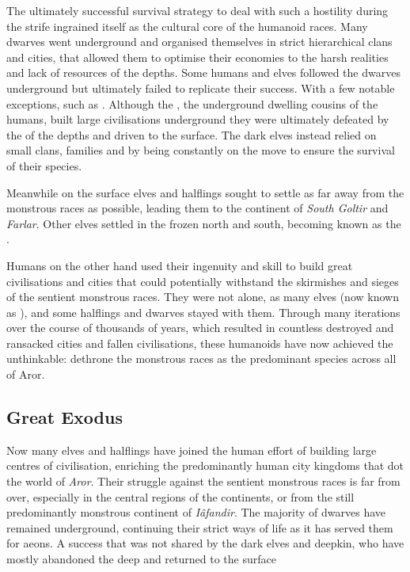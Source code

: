 The ultimately successful survival strategy to deal with such a hostility
during the strife ingrained itself as the cultural core of the humanoid
races. Many dwarves went underground and organised themselves in strict
hierarchical clans and cities, that allowed them to optimise their economies to
the harsh realities and lack of resources of the depths. Some humans and elves
followed the dwarves underground but ultimately failed to replicate their
success. With a few notable exceptions, such as .
Although the , the underground dwelling cousins of the
humans, built large civilisations underground they were ultimately defeated by
the  of the depths and driven to the surface. The dark elves
instead relied on small clans, families and by being constantly on the move to
ensure the survival of their species.

Meanwhile on the surface elves and halflings sought to settle as far away from
the monstrous races as possible, leading them to the continent of \emph{South
Goltir} and \emph{Farlar}. Other elves settled in the frozen north and south,
becoming known as the .

Humans on the other hand used their ingenuity and skill to build great
civilisations and cities that could potentially withstand the skirmishes and
sieges of the sentient monstrous races. They were not alone, as many elves
(now known as ), and some halflings and dwarves stayed
with them. Through many iterations over the course of thousands of years,
which resulted in countless destroyed and ransacked cities and fallen
civilisations, these humanoids have now achieved the unthinkable: dethrone the
monstrous races as the predominant species across all of Aror.

\subsection{Great Exodus}
\label{sec:Great Exodus}

Now many elves and halflings have joined the human effort of building large
centres of civilisation, enriching the predominantly human city kingdoms that
dot the world of \emph{Aror}. Their struggle against the sentient monstrous
races is far from over, especially in the central regions of the continents,
or from the still predominantly monstrous continent of \emph{Iâfandir}. The
majority of dwarves have remained underground, continuing their strict ways of
life as it has served them for aeons. A success that was not shared by the
dark elves and deepkin, who have mostly abandoned the deep and returned to the
surface


